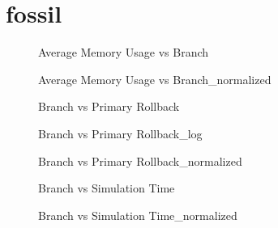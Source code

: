 \section{fossil}
\begin{figure}[H]
\centering

\caption{Average Memory Usage vs Branch}
\end{figure}
\vspace{1cm}
\begin{figure}[H]
\centering

\caption{Average Memory Usage vs Branch\_normalized}
\end{figure}
\vspace{1cm}
\newpage
\begin{figure}[H]
\centering

\caption{Branch vs Primary Rollback}
\end{figure}
\vspace{1cm}
\begin{figure}[H]
\centering

\caption{Branch vs Primary Rollback\_log}
\end{figure}
\vspace{1cm}
\newpage
\begin{figure}[H]
\centering

\caption{Branch vs Primary Rollback\_normalized}
\end{figure}
\vspace{1cm}
\begin{figure}[H]
\centering

\caption{Branch vs Simulation Time}
\end{figure}
\vspace{1cm}
\newpage
\begin{figure}[H]
\centering

\caption{Branch vs Simulation Time\_normalized}
\end{figure}
